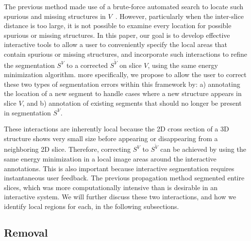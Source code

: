 \documentclass[]{spie}  %
\begin{document}
The previous method made use of a brute-force automated search to
locate such spurious and missing structures in $V$~\cite{waggoner:11}.
However, particularly when the inter-slice distance is too large, it
is not possible to examine every location for possible spurious or
missing structures.  In this paper, our goal is to develop effective
interactive tools to allow a user to conveniently specify the local
areas that contain spurious or missing structures, and incorporate
such interactions to refine the segmentation $S^V$ to a corrected
$S^{\tilde{V}}$ on slice $V$, using the same energy minimization
algorithm.  more specifically, we propose to allow the user to correct
these two types of segmentation errors within this framework by: a)
annotating the location of a new segment to handle cases where a new
structure appears in slice $V$, and b) annotation of existing segments
that should no longer be present in segmentation $S^V$.

These interactions are inherently local because the 2D cross section
of a 3D structure shows very small size before appearing or
disappearing from a neighboring 2D slice.  Therefore, correcting $S^V$
to $S^{\tilde{V}}$ can be achieved by using the same energy
minimization in a local image areas around the interactive
annotations.  This is also important because interactive segmentation
requires instantaneous user feedback.  The previous propagation method
segmented entire slices, which was more computationally intensive than
is desirable in an interactive system.  We will further discuss these
two interactions, and how we identify local regions for each, in the
following subsections.

\subsection{Removal}
\label{sec:remove}
\end{document}
